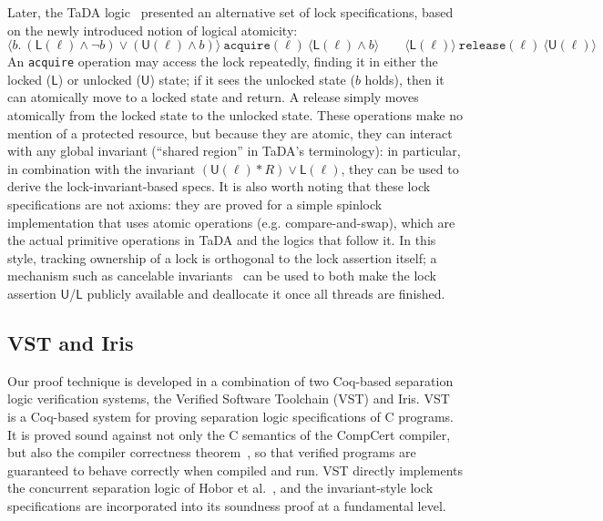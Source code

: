 \documentclass[runningheads]{llncs}
\begin{document}
Later, the TaDA logic~\cite{tada} presented an alternative set of lock specifications, based on the newly introduced notion of logical atomicity:
$$\langle b.\ (\mathsf{L}(\ell) \land \neg b) \vee (\mathsf{U}(\ell) \land b) \rangle\ \texttt{acquire}(\ell)\ \langle \mathsf{L}(\ell) \land b \rangle \qquad \langle \mathsf{L}(\ell) \rangle\ \texttt{release}(\ell)\ \langle \mathsf{U}(\ell) \rangle$$
An \texttt{acquire} operation may access the lock repeatedly, finding it in either the locked ($\mathsf{L}$) or unlocked ($\mathsf{U}$) state; if it sees the unlocked state ($b$ holds), then it can atomically move to a locked state and return. A release simply moves atomically from the locked state to the unlocked state. These operations make no mention of a protected resource, but because they are atomic, they can interact with any global invariant (``shared region'' in TaDA's terminology): in particular, in combination with the invariant $(\mathsf{U}(\ell) * R) \vee \mathsf{L}(\ell)$, they can be used to derive the lock-invariant-based specs. It is also worth noting that these lock specifications are not axioms: they are proved for a simple spinlock implementation that uses atomic operations (e.g. compare-and-swap), which are the actual primitive operations in TaDA and the logics that follow it. In this style, tracking ownership of a lock is orthogonal to the lock assertion itself; a mechanism such as cancelable invariants~\cite{rustbelt-relaxed} can be used to both make the lock assertion $\mathsf{U}$/$\mathsf{L}$ publicly available and deallocate it once all threads are finished.

\subsection{VST and Iris}

Our proof technique is developed in a combination of two Coq-based separation logic verification systems, the Verified Software Toolchain (VST) and Iris. VST~\cite{plfcc} is a Coq-based system for proving separation logic specifications of C programs. It is proved sound against not only the C semantics of the CompCert compiler, but also the compiler correctness theorem~\cite{cpm}, so that verified programs are guaranteed to behave correctly when compiled and run. VST directly implements the concurrent separation logic of Hobor et al.~\cite{oraclesematic}, and the invariant-style lock specifications are incorporated into its soundness proof at a fundamental level.
\end{document}
